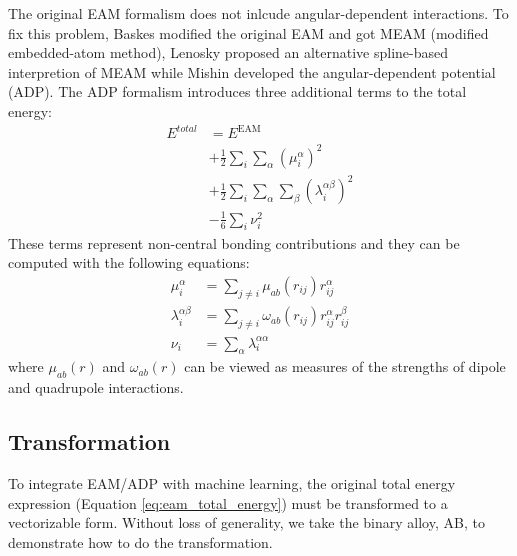 \documentclass[prb,reprint]{revtex4-2}
\begin{document}
The original EAM formalism does not inlcude angular-dependent interactions. To 
fix this problem, Baskes modified the original EAM and got MEAM (modified 
embedded-atom method), Lenosky proposed an alternative spline-based interpretion 
of MEAM  while Mishin developed the angular-dependent potential (ADP). The ADP 
formalism introduces three additional terms to the total energy:
\begin{align}
\label{eq:adp}
E^{total} 
& = E^{\mathrm{EAM}} \nonumber \\
& + \frac{1}{2}\sum_{i}{\sum_{\alpha}{(\mu_{i}^{\alpha})^2}} \nonumber \\
& + \frac{1}{2}\sum_{i}{
    \sum_{\alpha}{\sum_{\beta}{(\lambda_{i}^{\alpha\beta})^2}}} \nonumber \\
& - \frac{1}{6}\sum_{i}{\nu_{i}^{2}}
\end{align}
These terms represent non-central bonding contributions and they can be computed
with the following equations:
\begin{align}
\label{eq:adp_mu}
\mu_{i}^{\alpha} & = \sum_{j \neq i}{\mu_{ab}(r_{ij}) r_{ij}^{\alpha}} \\
\label{eq:adp_lambda}
\lambda_{i}^{\alpha\beta} & = \sum_{j \neq i}{
    \omega_{ab}(r_{ij}) r_{ij}^{\alpha}r_{ij}^{\beta}} \\
\label{eq:adp_nu}
\nu_{i} & = \sum_{\alpha}{\lambda_{i}^{\alpha\alpha}}
\end{align}
where $\mu_{ab}(r)$ and $\omega_{ab}(r)$ can be viewed as measures of the 
strengths of dipole and quadrupole interactions.

\subsection{Transformation}
\label{sec:transformation}

To integrate EAM/ADP with machine learning, the original total energy expression 
(Equation \ref{eq:eam_total_energy}) must be transformed to a vectorizable form. 
Without loss of generality, we take the binary alloy, AB, to demonstrate how to 
do the transformation.

\newcommand{\niaa}{N_{i}^{\mathrm{AA}}}
\newcommand{\niab}{N_{i}^{\mathrm{AB}}}
\newcommand{\njbb}{N_{j}^{\mathrm{BB}}}
\newcommand{\njba}{N_{j}^{\mathrm{BA}}}
\newcommand{\riaa}{\vec{\mathbf{r}}_{i}^{\mathrm{AA}}}
\newcommand{\riab}{\vec{\mathbf{r}}_{i}^{\mathrm{AB}}}
\newcommand{\ribb}{\vec{\mathbf{r}}_{i}^{\mathrm{BB}}}
\newcommand{\riba}{\vec{\mathbf{r}}_{i}^{\mathrm{BA}}}
\newcommand{\namax}{N_{\mathrm{A}}^{\mathrm{max}}}
\newcommand{\nbmax}{N_{\mathrm{B}}^{\mathrm{max}}}
\newcommand{\nnl}{N^{\mathrm{nl}}}
\newcommand{\nnli}{N^{\mathrm{nl}}_i}
\end{document}
